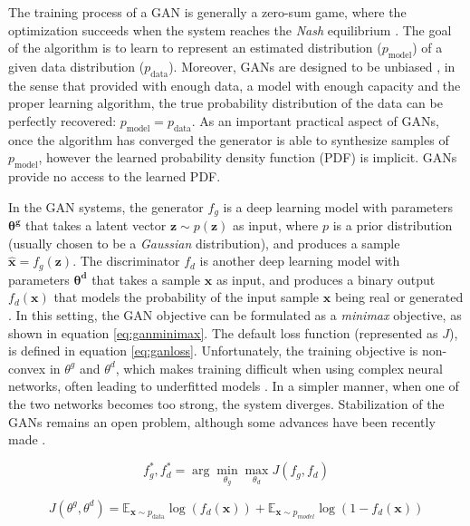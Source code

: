 The training process of a GAN is generally a zero-sum game, where the optimization succeeds when the system reaches the \textit{Nash} equilibrium \autocite{nash48}. The goal of the algorithm is to learn to represent an estimated distribution ($p_{\mathrm{model}}$) of a given data distribution ($p_{\mathrm{data}}$). Moreover, GANs are designed to be unbiased \autocite{Goodfellow2016}, in the sense that provided with enough data, a model with enough capacity and the proper learning algorithm, the true probability distribution of the data can be perfectly recovered: $p_{\mathrm{model}} = p_{\mathrm{data}}$. As an important practical aspect of GANs, once the algorithm has converged the generator is able to synthesize samples of $p_\mathrm{model}$, however the learned probability density function (PDF) is implicit. GANs provide no access to the learned PDF.

In the GAN systems, the generator $f_g$ is a deep learning model with parameters $\mathbf{\theta^g}$ that takes a latent vector $\mathbf{z} \sim p(\mathbf{z})$ as input, where $p$ is a prior distribution (usually chosen to be a \textit{Gaussian} distribution), and produces a sample $\hat{\mathbf{x}}=f_g(\mathbf{z})$. The discriminator $f_d$ is another deep learning model with parameters $\mathbf{\theta^d}$ that takes a sample $\mathbf{x}$ as input, and produces a binary output $f_d(\mathbf{x})$ that models the probability of the input sample $\mathbf{x}$ being real or generated \autocite{Goodfellow2014}. In this setting, the GAN objective can be formulated as a \textit{minimax} objective, as shown in equation \ref{eq:ganminimax}. The default loss function (represented as $J$), is defined in equation \ref{eq:ganloss}. Unfortunately, the training objective is non-convex in $\theta^g$ and $\theta^d$, which makes training difficult when using complex neural networks, often leading to underfitted models \autocite{Goodfellow2016b,Goodfellow2016}. In a simpler manner, when one of the two networks becomes too strong, the system diverges. Stabilization of the GANs remains an open problem, although some advances have been recently made \autocite{arjovsky2017, shaobo2017, wang2022}.

\begin{equation}
	\label{eq:ganminimax}
	f_g^*, f_d^* = \arg \min_{\theta_g} \max_{\theta_d} J(f_g, f_d)
\end{equation}

\begin{equation}
	\label{eq:ganloss}
	J(\theta^g, \theta^d) = \mathbb{E}_{\mathbf{x}\sim p_\mathrm{data}} \log (f_d(\mathbf{x})) + \mathbb{E}_{\mathbf{x}\sim p_{model}} \log (1 - f_d(\mathbf{x}))
\end{equation}

